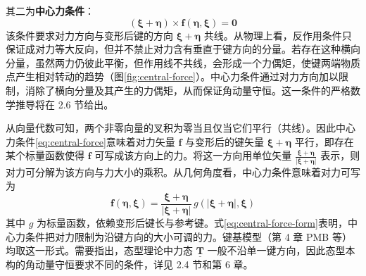 其二为\textbf{中心力条件}：
\begin{equation}
  (\boldsymbol{\xi}+\boldsymbol{\eta})\times\mathbf{f}(\boldsymbol{\eta},\boldsymbol{\xi})=\mathbf{0}
\end{equation}
该条件要求对力方向与变形后键的方向 $\boldsymbol{\xi}+\boldsymbol{\eta}$ 共线。从物理上看，反作用条件只保证成对力等大反向，但并不禁止对力含有垂直于键方向的分量。若存在这种横向分量，虽然两力仍彼此平衡，但作用线不共线，会形成一个力偶矩，使键两端物质点产生相对转动的趋势（图\ref{fig:central-force}）。中心力条件通过对力方向加以限制，消除了横向分量及其产生的力偶矩，从而保证角动量守恒。这一条件的严格数学推导将在 2.6 节给出。

从向量代数可知，两个非零向量的叉积为零当且仅当它们平行（共线）。因此中心力条件\eqref{eq:central-force}意味着对力矢量 $\mathbf{f}$ 与变形后的键矢量 $\boldsymbol{\xi}+\boldsymbol{\eta}$ 平行，即存在某个标量函数使得 $\mathbf{f}$ 可写成该方向上的力。将这一方向用单位矢量 $\frac{\boldsymbol{\xi}+\boldsymbol{\eta}}{|\boldsymbol{\xi}+\boldsymbol{\eta}|}$ 表示，则对力可分解为该方向与力大小的乘积。从几何角度看，中心力条件意味着对力可写为
\begin{equation}
  \mathbf{f}(\boldsymbol{\eta},\boldsymbol{\xi})=\frac{\boldsymbol{\xi}+\boldsymbol{\eta}}{|\boldsymbol{\xi}+\boldsymbol{\eta}|}\,g(|\boldsymbol{\xi}+\boldsymbol{\eta}|,\boldsymbol{\xi})
  \label{eq:central-force-form}
\end{equation}
其中 $g$ 为标量函数，依赖变形后键长与参考键。式\eqref{eq:central-force-form}表明，中心力条件把对力限制为沿键方向的大小可调的力。键基模型（第 4 章 PMB 等）均取这一形式。需要指出，态型理论中力态 $\underline{\mathbf{T}}$ 一般不沿单一键方向，因此态型本构的角动量守恒要求不同的条件，详见 2.4 节和第 6 章。

